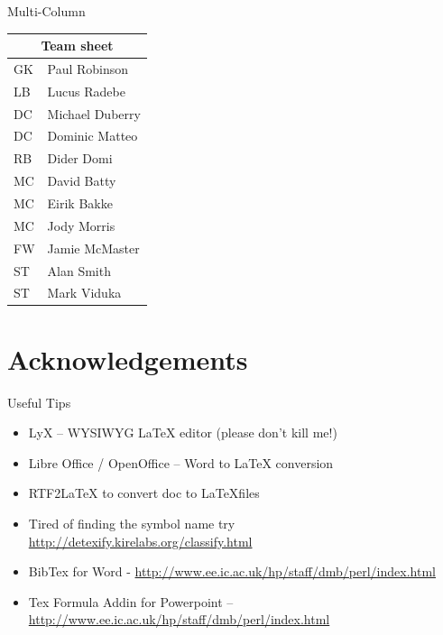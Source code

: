 \documentclass[10pt,times]{beamer}
\begin{document}
\begin{frame}{Multi-Column}
\begin{center}
\begin{tabular}{ |l|l| }
  \hline
  \multicolumn{2}{|c|}{Team sheet} \\
  \hline
  GK & Paul Robinson \\
  LB & Lucus Radebe \\
  DC & Michael Duberry \\
  DC & Dominic Matteo \\
  RB & Dider Domi \\
  MC & David Batty \\
  MC & Eirik Bakke \\
  MC & Jody Morris \\
  FW & Jamie McMaster \\
  ST & Alan Smith \\
  ST & Mark Viduka \\
  \hline
\end{tabular}
\end{center}
\end{frame}



\section{Acknowledgements}
\begin{frame}{Useful Tips}
\begin{itemize}
\item LyX – WYSIWYG LaTeX editor (please don’t kill me!)
\item Libre Office / OpenOffice – Word to LaTeX conversion
\item RTF2LaTeX to convert doc to \LaTeX files
\item Tired of finding the symbol name try \href{http://detexify.kirelabs.org/classify.html}{http://detexify.kirelabs.org/classify.html}
\item BibTex for Word - \href{http://www.ee.ic.ac.uk/hp/staff/dmb/perl/index.html}{http://www.ee.ic.ac.uk/hp/staff/dmb/perl/index.html}
\item Tex Formula Addin for Powerpoint – \href{http://users.ecs.soton.ac.uk/srg/softwaretools/presentation/TeX4PPT/}{http://www.ee.ic.ac.uk/hp/staff/dmb/perl/index.html} 
\end{itemize}
\end{frame}
\end{document}
